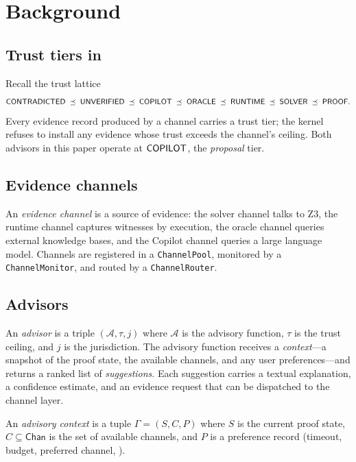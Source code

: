 \documentclass[11pt]{article}
\begin{document}
\section{Background}\label{sec:background}

\subsection{Trust tiers in \JuGeo{}}

Recall the trust lattice
\[
  \mathsf{CONTRADICTED} \;\preceq\; \mathsf{UNVERIFIED} \;\preceq\; \mathsf{COPILOT}
  \;\preceq\; \mathsf{ORACLE} \;\preceq\; \mathsf{RUNTIME}
  \;\preceq\; \mathsf{SOLVER} \;\preceq\; \mathsf{PROOF}.
\]
Every evidence record produced by a channel carries a trust tier;
the kernel refuses to install any evidence whose trust exceeds the
channel's ceiling.  Both advisors in this paper operate at
$\mathsf{COPILOT}$, the \emph{proposal} tier.

\subsection{Evidence channels}

An \emph{evidence channel} is a source of evidence:
the solver channel talks to Z3, the runtime channel captures
witnesses by execution, the oracle channel queries external
knowledge bases, and the Copilot channel queries a large
language model.  Channels are registered in a
\texttt{ChannelPool}, monitored by a \texttt{ChannelMonitor},
and routed by a \texttt{ChannelRouter}.

\subsection{Advisors}

An \emph{advisor} is a triple $(\mathcal{A}, \tau, j)$ where
$\mathcal{A}$ is the advisory function, $\tau$ is the trust
ceiling, and $j$ is the jurisdiction.  The advisory function
receives a \emph{context}---a snapshot of the proof state,
the available channels, and any user preferences---and returns
a ranked list of \emph{suggestions}.  Each suggestion carries
a textual explanation, a confidence estimate, and an evidence
request that can be dispatched to the channel layer.

\begin{definition}\label{def:context}
An \emph{advisory context} is a tuple
$\Gamma = (S, C, P)$ where $S$ is the current proof state,
$C \subseteq \mathsf{Chan}$ is the set of available channels,
and $P$ is a preference record (timeout, budget, preferred
channel, \etc{}).
\end{definition}
\end{document}
